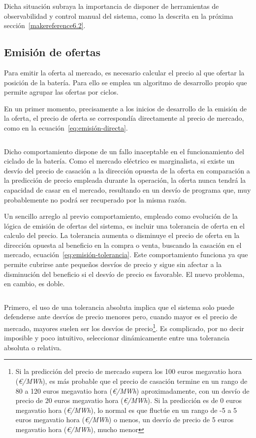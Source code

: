 Dicha situación subraya la importancia de disponer de herramientas de observabilidad y control manual del sistema, como la descrita en la próxima sección~\ref{makereference6.2}.

\subsection{Emisión de ofertas}
\label{makereference6.1.2}

Para emitir la oferta al mercado, es necesario calcular el precio al que ofertar la posición de la batería. Para ello se emplea un algoritmo de desarrollo propio que permite agrupar las ofertas por ciclos.

En un primer momento, precisamente a los inicios de desarrollo de la emisión de la oferta, el precio de oferta se correspondía directamente al precio de mercado, como en la ecuación~\ref{eq:emisión-directa}.

\begin{equation}
  \label{eq:emisión-directa}
\end{equation}

Dicho comportamiento dispone de un fallo inaceptable en el funcionamiento del ciclado de la batería. Como el mercado eléctrico es marginalista, si existe un desvío del precio de casación a la dirección opuesta de la oferta en comparación a la predicción de precio empleada durante la operación, la oferta nunca tendrá la capacidad de casar en el mercado, resultando en un desvío de programa que, muy probablemente no podrá ser recuperado por la misma razón.

Un sencillo arreglo al previo comportamiento, empleado como evolución de la lógica de emisión de ofertas del sistema, es incluir una tolerancia de oferta en el calculo del precio. La tolerancia aumenta o disminuye el precio de oferta en la dirección opuesta al beneficio en la compra o venta, buscando la casación en el mercado, ecuación~\ref{eq:emisión-tolerancia}. Este comportamiento funciona ya que permite cubrirse ante pequeños desvíos de precio y sigue sin afectar a la disminución del beneficio si el desvío de precio es favorable. El nuevo problema, en cambio, es doble.

\begin{equation}
  \label{eq:emisión-tolerancia}
\end{equation}

Primero, el uso de una tolerancia absoluta implica que el sistema solo puede defenderse ante desvíos de precio menores pero, cuando mayor es el precio de mercado, mayores suelen ser los desvíos de precio\footnote{Si la predicción del precio de mercado supera los 100 euros megavatio hora (\textit{€/MWh}), es más probable que el precio de casación termine en un rango de 80 a 120 euros megavatio hora (\textit{€/MWh}) aproximadamente, con un desvío de precio de 20 euros megavatio hora (\textit{€/MWh}). Si la predicción es de 0 euros megavatio hora (\textit{€/MWh}), lo normal es que fluctúe en un rango de -5 a 5 euros megavatio hora (\textit{€/MWh}) o menos, un desvío de precio de 5 euros megavatio hora (\textit{€/MWh}), mucho menor}. Es complicado, por no decir imposible y poco intuitivo, seleccionar dinámicamente entre una tolerancia absoluta o relativa.

